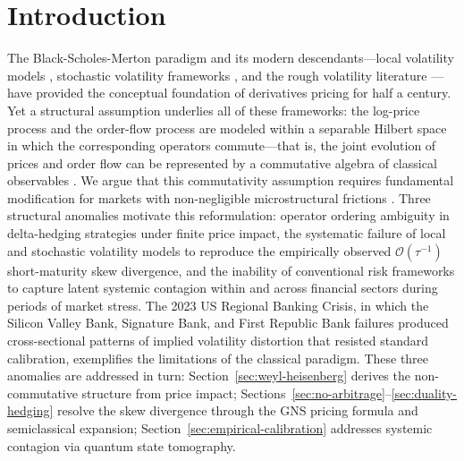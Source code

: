 
\section{Introduction}\label{sec:introduction}

The Black-Scholes-Merton paradigm \citep{black1973pricing,merton1973theory} and its
modern descendants---local volatility models \citep{dupire1994pricing}, stochastic
volatility frameworks \citep{heston1993closed,gatheral2006volatility}, and the rough
volatility literature \citep{bayer2015pricing,gatheral2018volatility}---have provided
the conceptual foundation of derivatives pricing for half a century. Yet a structural
assumption underlies all of these frameworks: the log-price process and the order-flow
process are modeled within a separable Hilbert space in which the corresponding
operators commute---that is, the joint evolution of prices and order flow can be
represented by a commutative algebra of classical observables
\citep{baaquie2004quantum,bouchaud2003theory,ilinski2001physics,follmer1986hedging}.
We argue that this commutativity assumption requires fundamental
modification for markets with non-negligible microstructural frictions
\citep{kyle1985continuous,almgren2005direct,toth2011anomalous,glosten1985bid}.
Three structural
anomalies motivate this reformulation: operator ordering ambiguity in delta-hedging
strategies under finite price impact, the systematic failure of local and stochastic
volatility models to reproduce the empirically observed $\mathcal{O}(\tau^{-1})$
short-maturity skew divergence, and the inability of conventional risk frameworks to capture latent systemic
contagion within and across financial sectors during periods of market stress.
The 2023 US Regional Banking Crisis, in which the Silicon Valley Bank, Signature
Bank, and First Republic Bank failures produced cross-sectional patterns of implied
volatility distortion that resisted standard calibration, exemplifies the limitations
of the classical paradigm. These three anomalies are addressed in turn:
Section~\ref{sec:weyl-heisenberg} derives the non-commutative structure from price
impact; Sections~\ref{sec:no-arbitrage}--\ref{sec:duality-hedging} resolve the skew
divergence through the GNS pricing formula and semiclassical expansion;
Section~\ref{sec:empirical-calibration} addresses systemic contagion via quantum
state tomography.

